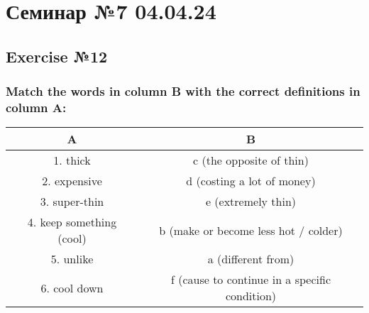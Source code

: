 \chapter{Семинар №7 04.04.24}

\section{Exercise №12}
\subsection*{Match the words in column B with the correct definitions in column A:}

\begin{center}
      \begin{tabular}{|c|c|}
            \hline
            \textbf{A}               & \textbf{B}                                    \\
            \hline
            1. thick                 & c (the opposite of thin)                      \\
            2. expensive             & d (costing a lot of money)                    \\
            3. super-thin            & e (extremely thin)                            \\
            4. keep something (cool) & b (make or become less hot / colder)          \\
            5. unlike                & a (different from)                            \\
            6. cool down             & f (cause to continue in a specific condition) \\
            \hline
      \end{tabular}
\end{center}


